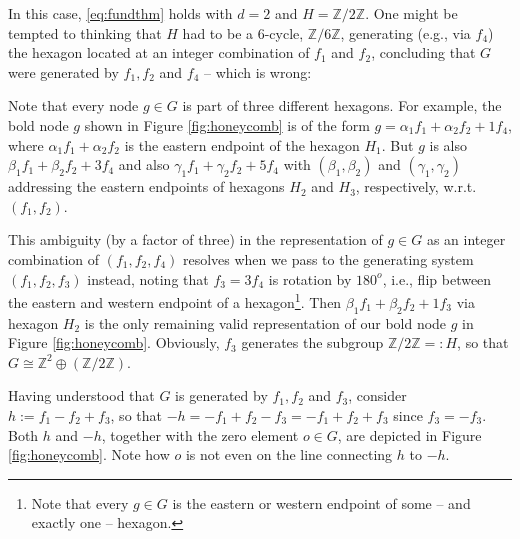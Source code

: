 \documentclass{article}
\newcommand\Z{{\mathbb Z}}
\newenvironment{example}
 {\par\noindent\refstepcounter{theorem}{\bf Example \thetheorem\ }}
 {\raisebox{1mm}{\framebox{}}\par\pagebreak[2]}
\numberwithin{equation}{section}   %
\numberwithin{figure}{section}  %
\begin{document}
\begin{example}
In this case, \eqref{eq:fundthm} holds with $d=2$ and $H=\Z/2\Z$. One might be tempted to thinking that $H$ had to be a $6$-cycle, $\Z/6\Z$, generating (e.g., via $f_4$) the hexagon located at an integer combination of $f_1$ and $f_2$, concluding that $G$ were generated by $f_1,f_2$ and $f_4$ -- which is wrong:

Note that every node $g\in G$ is part of three different hexagons. For example, the bold node $g$ shown in Figure \ref{fig:honeycomb} is of the form $g=\alpha_1f_1+\alpha_2f_2+1f_4$, where $\alpha_1f_1+\alpha_2f_2$ is the eastern endpoint of the hexagon $H_1$. But $g$ is also $\beta_1f_1+\beta_2f_2+3f_4$ and also $\gamma_1f_1+\gamma_2f_2+5f_4$ with $(\beta_1,\beta_2)$ and $(\gamma_1,\gamma_2)$ addressing the eastern endpoints of hexagons $H_2$ and $H_3$, respectively, w.r.t.~$(f_1,f_2)$.

This ambiguity (by a factor of three) in the representation of $g\in G$ as an integer combination of $(f_1,f_2,f_4)$ resolves when we pass to the generating system $(f_1,f_2,f_3)$ instead, noting that $f_3=3f_4$ is rotation by $180^o$, i.e., flip between the eastern and western endpoint of a hexagon\footnote{Note that every $g\in G$ is the eastern or western endpoint of some -- and exactly one -- hexagon.}. Then $\beta_1f_1+\beta_2f_2+1f_3$ via hexagon $H_2$ is the only remaining valid representation of our bold node $g$ in Figure \ref{fig:honeycomb}. Obviously, $f_3$ generates the subgroup $\Z/2\Z=:H$, so that $G\cong \Z^2\oplus (\Z/2\Z)$. 

Having understood that $G$ is generated by $f_1,f_2$ and $f_3$, consider $h:=f_1-f_2+f_3$, so that $-h=-f_1+f_2-f_3=-f_1+f_2+f_3$ since $f_3=-f_3$. Both $h$ and $-h$, together with the zero element $o\in G$, are depicted in Figure \ref{fig:honeycomb}. Note how $o$ is not even on the line connecting $h$ to $-h$.


\end{example}
\end{document}

